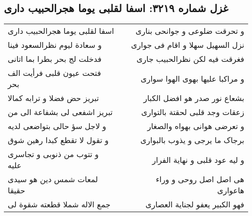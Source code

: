 \begin{center}
\section*{غزل شماره ۳۲۱۹: اسفا لقلبی یوما هجرالحبیب داری}
\label{sec:3219}
\begin{longtable}{l p{0.5cm} r}
اسفا لقلبی یوما هجرالحبیب داری
&&
و تحرقت ضلوعی و جوانحی بناری
\\
و سعادة لیوم نظرالسعود فینا
&&
نزل السهیل سهلا و اقام فی جواری
\\
فدخلت لج بحر بطرا بما اتانی
&&
فغرقت فیه لکن نظرالحبیب جاری
\\
فتحت عیون قلبی فرأیت الف بحر
&&
و مراکبا علیها بهوی الهوا سواری
\\
تبریز حض فضلا و ترابه کمالا
&&
بشعاع نور صدر هو افضل الکبار
\\
تبریز اشفعی لی بشفاعة الی من
&&
زعقات وجد قلبی لحقتة بالتواری
\\
و لاجل سؤ حالی بتواضعی لدیه
&&
و تعرضی هوانی بهواه والصغار
\\
و تقول لا تقطع کبدا رهین شوق
&&
برجاک ما یرجی و یذوب بالبواری
\\
و تتوب من ذنوبی و تجاسری علیه
&&
و لیه عود قلبی و نهایة الفرار
\\
لمعات شمس دین هو سیدی حقیقا
&&
هی اصل اصل روحی و وراء هاعواری
\\
جمع الاله شملا قطعته شقوة لی
&&
فهو الکبیر یعفو لجنایة العصاری
\\
\end{longtable}
\end{center}
